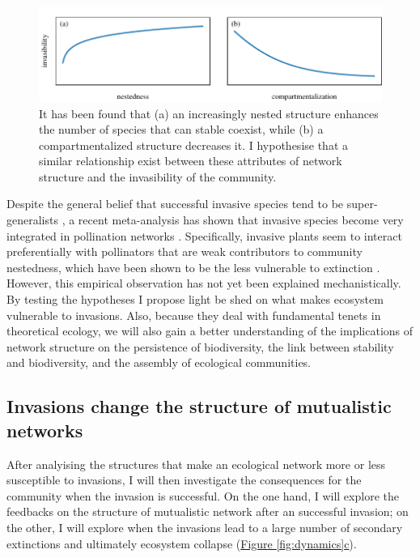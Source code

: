 \documentclass[a4paper]{article}
\begin{document}
\begin{figure}[tbp]
  \includegraphics{hypo_c1}
  \caption{
  \label{fig:hypo_c1}
  It has been found that (a) an increasingly nested structure enhances the number of species that can stable coexist, while (b) a compartmentalized structure decreases it.
  I hypothesise that a similar relationship exist between these attributes of network structure and the invasibility of the community.
  }
\end{figure}

Despite the general belief that successful invasive species tend to be super-generalists \autocite{Richardson2000, Aizen2008, Vila2009, Albrecht2014}, a recent meta-analysis has shown that invasive species become very integrated in pollination networks \autocite{Stouffer2014}.
Specifically, invasive plants seem to interact preferentially with pollinators that are weak contributors to community nestedness, which have been shown to be the less vulnerable to extinction \autocite{Saavedra2011, Stouffer2014}.
However, this empirical observation has not yet been explained mechanistically.
By testing the hypotheses I propose light be shed on what makes ecosystem vulnerable to invasions.
Also, because they deal with fundamental tenets in theoretical ecology, we will also gain a better understanding of the implications of network structure on the persistence of biodiversity, the link between stability and biodiversity, and the assembly of ecological communities.

\subsection{Invasions change the structure of mutualistic networks}

After analyising the structures that make an ecological network more or less susceptible to invasions, I will then investigate the consequences for the community when the invasion is successful.
On the one hand, I will explore the feedbacks on the structure of mutualistic network after an successful invasion; on the other, I will explore when the invasions lead to a large number of secondary extinctions and ultimately ecosystem collapse (\hyperref[fig:dynamics]{Figure \ref{fig:dynamics}c}).
\end{document}
